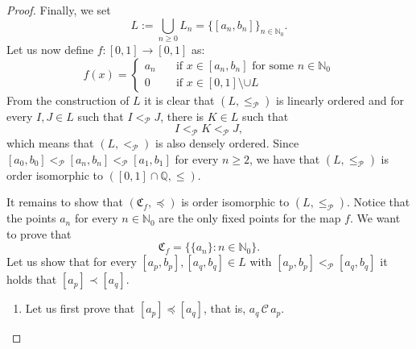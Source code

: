 \documentclass[pdflatex,sn-mathphys-num]{sn-jnl}
\theoremstyle{thmstyleone}%
\theoremstyle{thmstyletwo}%
\theoremstyle{thmstylethree}%
\begin{document}
\begin{proof}
\noindent Finally, we set 
\[
L:=\bigcup_{n\geq 0}L_n=\{[a_n,b_n]\}_{n\in\mathbb{N}_0}.
\]
Let us now define $f:[0,1]\to [0,1]$ as:
\begin{equation}\label{dis_func}
    f(x)=
    \begin{cases}
        a_n &\quad\text{if } x\in[a_n,b_n] \text{ for some }n\in\mathbb{N}_0\\
        0 &\quad\text{if } x\in[0,1]\setminus \cup L
    \end{cases}
\end{equation}
From the construction of $L$ it is clear that $(L,\le_\mathcal{P})$ is linearly ordered and for every $I, J\in L$ such that $I<_\mathcal{P} J$, there is $K\in L$ such that
\[
I<_\mathcal{P} K<_\mathcal{P} J,
\]
which means that $(L,<_\mathcal{P})$ is also densely ordered.
Since $[a_0,b_0]<_\mathcal{P} [a_n,b_n]<_\mathcal{P} [a_1,b_1]$ for every $n\ge2$, we have that $(L,\le_\mathcal{P})$ is order isomorphic to $([0,1]\cap \mathbb{Q}, \leq)$.

\noindent It remains to show that $(\mathfrak{C}_f,\preceq)$ is order isomorphic to $(L,\le_\mathcal{P})$.
Notice that the points $a_n$ for every $n\in\mathbb{N}_0$ are the only fixed points for the map $f$.
We want to prove that
$$
\mathfrak{C}_f=
\{\{a_n\}: n\in\mathbb{N}_0\}.
$$
\noindent Let us show that for every $[a_p,b_p],[a_q,b_q]\in L$ with $[a_p,b_p]<_\mathcal{P} [a_q,b_q]$ it holds that $[a_p]\prec [a_q]$.
\begin{enumerate}
\item Let us first prove that $[a_p]\preceq [a_q]$, that is, $a_q\,\mathcal{C}\, a_p$.   


\end{enumerate}
\end{proof}
\end{document}
